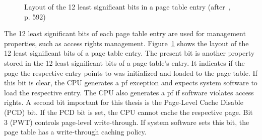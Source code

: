 \begin{figure}
  \begin{center}
    
    \caption{Layout of the 12 least significant bits in a page table entry (after~\cite{amd_manual}, p. 592)}
    \label{fig:state:technical:paging_rights}
  \end{center}
\end{figure}
The 12 least significant bits of each page table entry are used for management
properties, such as access rights management.
Figure~\ref{fig:state:technical:paging_rights} shows the layout of the 12 least
significant bits of a page table entry. The present bit is another property
stored in the 12 least significant bits of a page table's entry. It indicates if
the page the respective entry points to was initialized and loaded to the page
table. If this bit is clear, the CPU generates a \gls{pf} exception and expects
system software to load the respective entry. The CPU also generates a \gls{pf}
if software violates access rights. A second bit important for this thesis is
the Page-Level Cache Disable (PCD) bit. If the PCD bit is set, the CPU cannot
cache the respective page. Bit 3 (PWT) controls page-level write-through. If
system software sets this bit, the page table has a write-through caching
policy.
